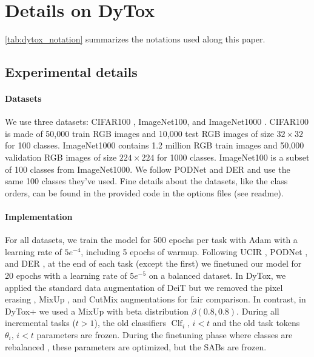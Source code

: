 \section{Details on DyTox}
\label{sec:appendix_dytox}


\noindent\autoref{tab:dytox_notation} summarizes the notations used along this paper.




\subsection{Experimental details}

\paragraph{Datasets} We use three datasets: CIFAR100 \citep{krizhevskycifar100}, ImageNet100, and
ImageNet1000 \citep{deng2009imagenet}. CIFAR100 is made of 50,000 train RGB images and 10,000 test
RGB images of size $32\times32$ for 100 classes. ImageNet1000 contains 1.2 million RGB train images
and 50,000 validation RGB images of size $224\times224$ for 1000 classes. ImageNet100 is a subset of
100 classes from ImageNet1000. We follow PODNet \citep{douillard2020podnet} and DER \citep{yan2021der}
and use the same 100 classes they've used. Fine details about the datasets, like the class orders,
can be found in the provided code in the options files (see readme).

\paragraph{Implementation} For all datasets, we train the model for 500 epochs per task with Adam
\citep{kingma2014adam} with a learning rate of $5e^{-4}$, including 5 epochs of warmup.
Following UCIR \citep{hou2019ucir}, PODNet \citep{douillard2020podnet}, and DER \citep{yan2021der}, at
the end of each task (except the first) we finetuned our model for 20 epochs with a learning rate of
$5e^{-5}$ on a balanced dataset. In DyTox, we applied the standard data augmentation of DeiT
\citep{touvron2021deit} but we removed the pixel erasing \citep{zhong2017erasing}, MixUp
\citep{hingyi2018mixup}, and CutMix \citep{yun2019cutmix} augmentations for fair comparison. In
contrast, in DyTox+ we used a MixUp \citep{hingyi2018mixup} with beta distribution $\beta(0.8, 0.8)$.
During all incremental tasks ($t>1$), the old classifiers $\operatorname{Clf}_i,\, i < t$ and the
old task tokens $\theta_i,\, i < t$ parameters are frozen. During the finetuning phase where classes
are rebalanced \citep{castro2018end_to_end_inc_learn,hou2019ucir,douillard2020podnet,yan2021der},
these parameters are optimized, but the SABs are frozen.

